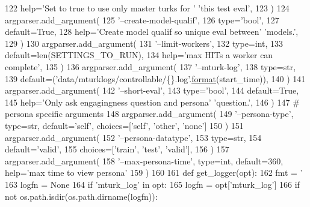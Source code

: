 \begin{DoxyCode}
{122         help=\textcolor{stringliteral}{'Set to true to use only master turks for '} \textcolor{stringliteral}{'this test eval'},
123     )
124     argparser.add\_argument(
125         \textcolor{stringliteral}{'--create-model-qualif'},
126         type=\textcolor{stringliteral}{'bool'},
127         default=\textcolor{keyword}{True},
128         help=\textcolor{stringliteral}{'Create model qualif so unique eval between'} \textcolor{stringliteral}{'models.'},
129     )
130     argparser.add\_argument(
131         \textcolor{stringliteral}{'--limit-workers'},
132         type=int,
133         default=len(SETTINGS\_TO\_RUN),
134         help=\textcolor{stringliteral}{'max HITs a worker can complete'},
135     )
136     argparser.add\_argument(
137         \textcolor{stringliteral}{'--mturk-log'},
138         type=str,
139         default=(\textcolor{stringliteral}{'data/mturklogs/controllable/\{\}.log'}.\hyperlink{namespaceparlai_1_1chat__service_1_1services_1_1messenger_1_1shared__utils_a32e2e2022b824fbaf80c747160b52a76}{format}(start\_time)),
140     )
141     argparser.add\_argument(
142         \textcolor{stringliteral}{'--short-eval'},
143         type=\textcolor{stringliteral}{'bool'},
144         default=\textcolor{keyword}{True},
145         help=\textcolor{stringliteral}{'Only ask engagingness question and persona'} \textcolor{stringliteral}{'question.'},
146     )
147     \textcolor{comment}{# persona specific arguments}
148     argparser.add\_argument(
149         \textcolor{stringliteral}{'--persona-type'}, type=str, default=\textcolor{stringliteral}{'self'}, choices=[\textcolor{stringliteral}{'self'}, \textcolor{stringliteral}{'other'}, \textcolor{stringliteral}{'none'}]
150     )
151     argparser.add\_argument(
152         \textcolor{stringliteral}{'--persona-datatype'},
153         type=str,
154         default=\textcolor{stringliteral}{'valid'},
155         choices=[\textcolor{stringliteral}{'train'}, \textcolor{stringliteral}{'test'}, \textcolor{stringliteral}{'valid'}],
156     )
157     argparser.add\_argument(
158         \textcolor{stringliteral}{'--max-persona-time'}, type=int, default=360, help=\textcolor{stringliteral}{'max time to view persona'}
159     )
160 
161     \textcolor{keyword}{def }get\_logger(opt):
162         fmt = \textcolor{stringliteral}{'%
163         logfn = \textcolor{keywordtype}{None}
164         \textcolor{keywordflow}{if} \textcolor{stringliteral}{'mturk\_log'} \textcolor{keywordflow}{in} opt:
165             logfn = opt[\textcolor{stringliteral}{'mturk\_log'}]
166             \textcolor{keywordflow}{if} \textcolor{keywordflow}{not} os.path.isdir(os.path.dirname(logfn)):
}}
\end{DoxyCode}
